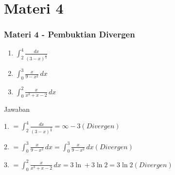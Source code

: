 \documentclass{beamer}
\begin{document}
\section{Materi 4}

\begin{frame}
  \frametitle{Materi 4 - Pembuktian Divergen}
  \begin{enumerate}
    \item $\displaystyle \int_{2}^{4} \frac{dx}{(3-x)^{\frac{2}{3}}}$
    \item $\displaystyle \int_{0}^{3} \frac{x}{9-x^2} \, dx$
    \item $\displaystyle \int_{0}^{2} \frac{x}{x^3+x-2} \, dx$
  \end{enumerate}
\end{frame}
\begin{frame}{Jawaban}
 \begin{enumerate}
1. $\displaystyle=\int_{2}^{4} \frac{dx}{(3-x)^{\frac{2}{3}}}=\infty-3(Divergen)$
 \end{enumerate}
 \begin{enumerate}
2. $\displaystyle=\int_{0}^{3} \frac{x}{9-x^2} \, dx =\int_{0}^{3}\frac{x}{9-x^2}\,dx(Divergen)$
 \end{enumerate}
 \begin{enumerate}
3. $\displaystyle=\int_{0}^{2} \frac{x}{x^3+x-2} \, dx=3\ln +3\ln2=3\ln2(Divergen)$
 \end{enumerate}
\end{frame}
\end{document}
